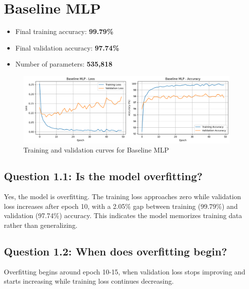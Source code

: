 \section{Baseline MLP}

\begin{itemize}
    \item Final training accuracy: \textbf{99.79\%}
    \item Final validation accuracy: \textbf{97.74\%}
    \item Number of parameters: \textbf{535,818}
\end{itemize}

\begin{figure}[h]
    \centering
    \includegraphics[width=0.7\linewidth]{section1/baselineMLP.png}
    \caption{Training and validation curves for Baseline MLP}
    \label{fig:baseline}
\end{figure}

\subsection{Question 1.1: Is the model overfitting?}
Yes, the model is overfitting. The training loss approaches zero while validation loss increases after epoch 10, with a 2.05\% gap between training (99.79\%) and validation (97.74\%) accuracy. This indicates the model memorizes training data rather than generalizing.

\subsection{Question 1.2: When does overfitting begin?}
Overfitting begins around epoch 10-15, when validation loss stops improving and starts increasing while training loss continues decreasing.